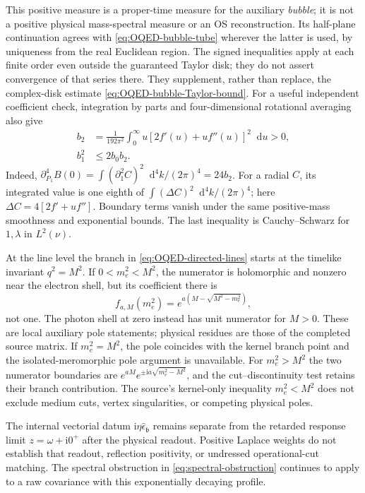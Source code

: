 \documentclass[final,5p,times,twocolumn,numbers,nopreprintline]{elsarticle}
\numberwithin{equation}{section}
\theoremstyle{definition}
\theoremstyle{remark}
\newcommand{\dd}{\mathop{}\!\mathrm d}
\newcommand{\ii}{\mathrm i}
\newcommand{\bb}{\mathfrak b}
\newcommand{\epsvec}{\hat\epsilon_{\bb}}
\begin{document}
This positive measure is a proper-time measure for the auxiliary
\emph{bubble}; it is not a positive physical mass-spectral measure or
an OS reconstruction. Its half-plane continuation agrees with
\eqref{eq:OQED-bubble-tube} wherever the latter is used, by uniqueness
from the real Euclidean region. The signed inequalities apply at each
finite order even outside the guaranteed Taylor disk; they do not
assert convergence of that series there. They supplement, rather than
replace, the complex-disk estimate \eqref{eq:OQED-bubble-Taylor-bound}.
For a useful independent coefficient check, integration by parts and
four-dimensional rotational averaging also give
\begin{equation}
 \begin{aligned}
 b_2&=\frac1{192\pi^2}\int_0^\infty
             u[2f'(u)+uf''(u)]^2\dd u>0,\\
 b_1^2&\leq2b_0b_2 .
 \end{aligned}
 \label{eq:OQED-scalar-second-coefficient}
\end{equation}
Indeed, \(\partial_{P_1}^4B(0)=\int(\partial_1^2C)^2\dd^4k/(2\pi)^4
=24b_2\). For a radial \(C\), its integrated value is one eighth
of \(\int(\Delta C)^2\dd^4k/(2\pi)^4\); here
\(\Delta C=4[2f'+uf'']\). Boundary terms vanish under the same
positive-mass smoothness and exponential bounds. The last inequality
is Cauchy--Schwarz for \(1,\lambda\) in \(L^2(\nu)\).

At the line level the branch in \eqref{eq:OQED-directed-lines} starts
at the timelike invariant \(q^2=M^2\). If \(0<m_e^2<M^2\), the
numerator is holomorphic and nonzero near the electron shell, but its
coefficient there is
\begin{equation}
 f_{a,M}(m_e^2)
    =e^{a(M-\sqrt{M^2-m_e^2})},
\label{eq:OQED-electron-shell-weight}
\end{equation}
not one. The photon shell at zero instead has unit numerator for
\(M>0\). These are local auxiliary pole statements; physical residues
are those of the completed source matrix. If \(m_e^2=M^2\), the pole
coincides with the kernel branch point and the isolated-meromorphic
pole argument is unavailable. For \(m_e^2>M^2\) the two numerator
boundaries are \(e^{aM}e^{\pm\ii a\sqrt{m_e^2-M^2}}\), and the
cut--discontinuity test retains their branch contribution. The source's
kernel-only inequality \(m_e^2<M^2\) does not exclude medium cuts,
vertex singularities, or competing physical poles.

The internal vectorial datum \(\ii\eta\epsvec\) remains separate
from the retarded response limit \(z=\omega+\ii0^+\) after the
physical readout. Positive Laplace weights do not establish that
readout, reflection positivity, or undressed operational-cut matching.
The spectral obstruction in \eqref{eq:spectral-obstruction} continues
to apply to a raw covariance with this exponentially decaying profile.
\end{document}
